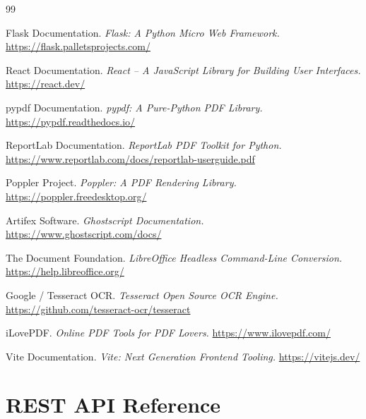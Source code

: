 \documentclass[12pt,a4paper]{report}
\begin{document}
\begin{thebibliography}{99}

 Flask Documentation. \textit{Flask: A Python Micro Web Framework.}
  \url{https://flask.palletsprojects.com/}

 React Documentation. \textit{React -- A JavaScript Library for Building User
  Interfaces.} \url{https://react.dev/}

 pypdf Documentation. \textit{pypdf: A Pure-Python PDF Library.}
  \url{https://pypdf.readthedocs.io/}

 ReportLab Documentation. \textit{ReportLab PDF Toolkit for Python.}
  \url{https://www.reportlab.com/docs/reportlab-userguide.pdf}

 Poppler Project. \textit{Poppler: A PDF Rendering Library.}
  \url{https://poppler.freedesktop.org/}

 Artifex Software. \textit{Ghostscript Documentation.}
  \url{https://www.ghostscript.com/docs/}

 The Document Foundation. \textit{LibreOffice Headless Command-Line
  Conversion.} \url{https://help.libreoffice.org/}

 Google / Tesseract OCR. \textit{Tesseract Open Source OCR Engine.}
  \url{https://github.com/tesseract-ocr/tesseract}

 iLovePDF. \textit{Online PDF Tools for PDF Lovers.}
  \url{https://www.ilovepdf.com/}

 Vite Documentation. \textit{Vite: Next Generation Frontend Tooling.}
  \url{https://vitejs.dev/}

\end{thebibliography}

\appendix
\chapter{REST API Reference}
\end{document}
